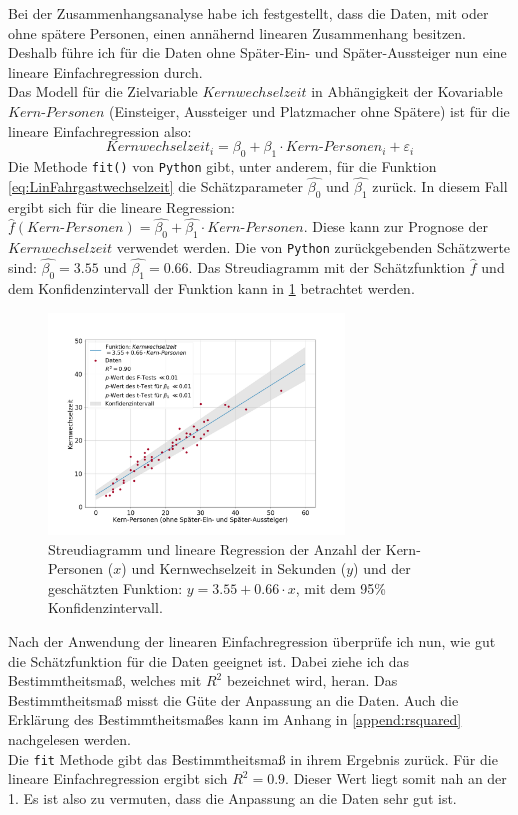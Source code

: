 Bei der Zusammenhangsanalyse habe ich festgestellt, dass die Daten, mit oder ohne spätere Personen, einen annähernd linearen Zusammenhang besitzen. Deshalb führe ich für die Daten ohne Später-Ein- und Später-Aussteiger nun eine lineare Einfachregression durch.\\
Das Modell für die Zielvariable $Kernwechselzeit$ in Abhängigkeit der Kovariable $Kern\text{-}Personen$ (Einsteiger, Aussteiger und Platzmacher ohne Spätere) ist für die lineare Einfachregression also:
\begin{equation}
Kernwechselzeit_i = \beta_0 + \beta_1 \cdot Kern\text{-}Personen_i + \varepsilon_i
\label{eq:LinFahrgastwechselzeit}
\end{equation} 
Die Methode \texttt{fit()} von \texttt{Python} gibt, unter anderem, für die Funktion \ref{eq:LinFahrgastwechselzeit} die Schätzparameter $\hat{\beta_0}$ und $\hat{\beta_1}$ zurück. In diesem Fall ergibt sich für die lineare Regression: $\hat{f}(Kern\text{-}Personen) = \hat{\beta_0} + \hat{\beta_1} \cdot Kern\text{-}Personen$. Diese kann zur Prognose der $Kernwechselzeit$ verwendet werden.
Die von \texttt{Python} zurückgebenden Schätzwerte sind: $\hat{\beta_0}=3.55$ und $\hat{\beta_1}=0.66$. Das Streudiagramm mit der Schätzfunktion $\hat{f}$ und dem Konfidenzintervall der Funktion kann in \figurename \ref{fig:LinReg} betrachtet werden.
\begin{figure}[H]
	\centering
		\includegraphics[width=0.7\textwidth]{pictures/data_evaluation/transferTime/lin_core_transfer_time.png}
	\caption{Streudiagramm und lineare Regression der Anzahl der Kern-Personen ($x$) und Kernwechselzeit in Sekunden ($y$) und der geschätzten Funktion: $y = 3.55 + 0.66 \cdot x$, mit dem 95\% Konfidenzintervall.}
	\label{fig:LinReg}
\end{figure}
Nach der Anwendung der linearen Einfachregression überprüfe ich nun, wie gut die Schätzfunktion für die Daten geeignet ist. Dabei ziehe ich das Bestimmtheitsmaß, welches mit $R^2$ bezeichnet wird, heran. Das Bestimmtheitsmaß misst die Güte der Anpassung an die Daten. Auch die Erklärung des Bestimmtheitsmaßes kann im Anhang in \ref{append:rsquared} nachgelesen werden. \\
Die \texttt{fit} Methode gibt das Bestimmtheitsmaß in ihrem Ergebnis zurück. Für die lineare Einfachregression ergibt sich $R^2=0.9$. Dieser Wert liegt somit nah an der 1. Es ist also zu vermuten, dass die Anpassung an die Daten sehr gut ist. 

